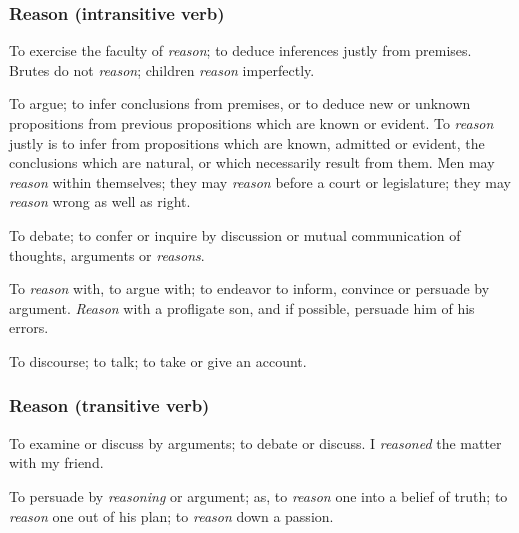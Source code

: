 	\subsubsection{Reason (intransitive verb)}
	
		\begin{compactitem}
			\item[1] To exercise the faculty of \textit{reason}; to deduce inferences justly from premises. Brutes do not \textit{reason}; children \textit{reason} imperfectly.
			\item[2] To argue; to infer conclusions from premises, or to deduce new or unknown propositions from previous propositions which are known or evident. To \textit{reason} justly is to infer from propositions which are known, admitted or evident, the conclusions which are natural, or which necessarily result from them. Men may \textit{reason} within themselves; they may \textit{reason} before a court or legislature; they may \textit{reason} wrong as well as right.
			\item[3] To debate; to confer or inquire by discussion or mutual communication of thoughts, arguments or \textit{reasons}.
			\item[4] To \textit{reason} with, to argue with; to endeavor to inform, convince or persuade by argument. \textit{Reason} with a profligate son, and if possible, persuade him of his errors.
			\item[5] To discourse; to talk; to take or give an account.
		\end{compactitem}
		
	\subsubsection{Reason (transitive verb)}
	
		\begin{compactitem}
			\item[1] To examine or discuss by arguments; to debate or discuss. I \textit{reasoned} the matter with my friend.
			\item[2] To persuade by \textit{reasoning} or argument; as, to \textit{reason} one into a belief of truth; to \textit{reason} one out of his plan; to \textit{reason} down a passion.
		\end{compactitem}



